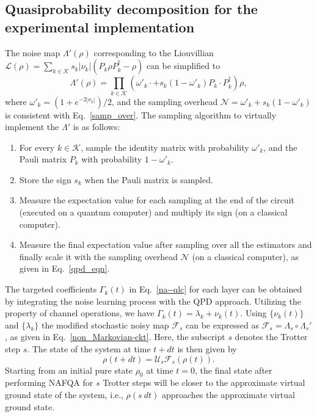 \documentclass[10pt, superscriptaddress,aps,pra,twocolumn,showpacs,nofootinbib, longbibliography, notitlepage,floatfix]{revtex4-2}
\begin{document}
\subsection*{Quasiprobability decomposition for the experimental implementation}
The noise map $\Lambda'(\rho)$ corresponding to the Liouvillian $\mathcal{L}(\rho) = \sum_{k\in \mathcal{K}} s_k |\nu_k| (P_k \rho P_k^{\dagger} - \rho)$  can be simplified to~\cite{vandenBerg2023_natphys} 
\begin{equation}
    \Lambda'(\rho) = \prod_{k\in\mathcal{K}} \left( \omega'_k \cdot + s_k (1-\omega'_k) P_k \cdot P_k^{\dagger} \right) \rho,
\end{equation}
where $\omega'_k = (1+e^{-2 |\nu_k| })/2$, and the sampling overhead $\mathcal{N} = \omega'_k +  s_k (1-\omega'_k)$  is consistent with Eq.~\eqref{samp_over}. The sampling algorithm to virtually implement the $\Lambda'$ is as follows:
\begin{enumerate}
    \item For every $k\in\mathcal{K}$, sample the identity matrix with probability $\omega'_k$, and the Pauli matrix $P_k$ with probability $1-\omega'_k$.
    \item Store the sign $s_k$ when the Pauli matrix is sampled. 
    \item Measure the expectation value for each sampling at the end of the circuit (executed on a quantum computer) and multiply its sign (on a classical computer).
    \item Measure the final expectation value after sampling over all the estimators and finally scale it with the sampling overhead $\mathcal{N}$ (on a classical computer), as given in Eq.~\eqref{qpd_eqn}.
\end{enumerate}

The targeted coefficients $\Gamma_k(t)$ in Eq.~\eqref{na--qlc} for each layer can be obtained by integrating the noise learning process with the QPD approach. Utilizing the property of channel operations, we have $\Gamma_k(t) = \lambda_k + \nu_k(t)$. Using $\{\nu_k(t)\}$ and $\{\lambda_k\}$ the modified stochastic noisy map $\mathcal{F}_s$ can be expressed as $\mathcal{F}_s = \Lambda_s \circ \Lambda_s'$, as given in Eq.~\eqref{non_Markovian-ckt}. Here, the subscript $s$ denotes the Trotter step $s$. The state of the system at time $t+dt$ is then given by 
\begin{equation}
    \rho(t+ dt) = \mathcal{{U}}_s \mathcal {F}_s (\rho(t)).
\end{equation}
Starting from an initial pure state $\rho_0$ at time $t = 0$, the final state after performing NAFQA for $s$ Trotter steps will be closer to the approximate virtual ground state of the system, i.e., $\rho(s ~dt)$ approaches the approximate virtual ground state.
\end{document}
